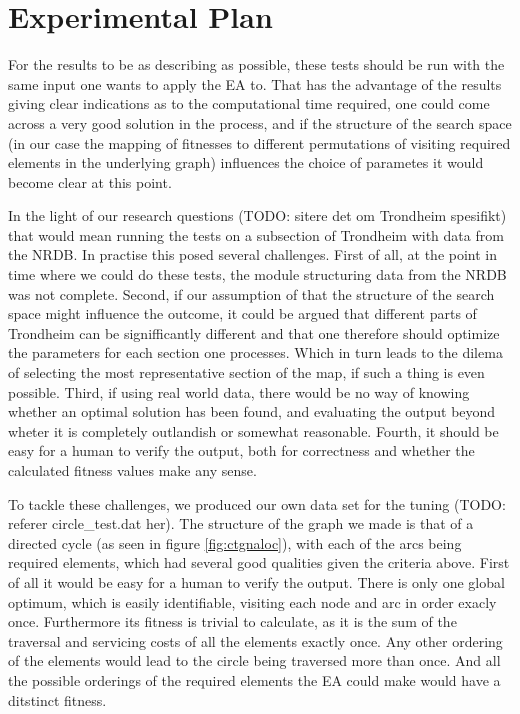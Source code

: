 \section{Experimental Plan} %
\label{sec:experimental_plan}
For the results to be as describing as possible, these tests should be run with the same input one wants to apply the EA to. That has the advantage of the results giving clear indications as to the computational time required, one could come across a very good solution in the process, and if the structure of the search space (in our case the mapping of fitnesses to different permutations of visiting required elements in the underlying graph) influences the choice of parametes it would become clear at this point.

In the light of our research questions (TODO: sitere det om Trondheim spesifikt) that would mean running the tests on a subsection of Trondheim with data from the NRDB. In practise this posed several challenges. First of all, at the point in time where we could do these tests, the module structuring data from the NRDB was not complete. Second, if our assumption of that the structure of the search space might influence the outcome, it could be argued that different parts of Trondheim can be signifficantly different and that one therefore should optimize the parameters for each section one processes. Which in turn leads to the dilema of selecting the most representative section of the map, if such a thing is even possible. Third, if using real world data, there would be no way of knowing whether an optimal solution has been found, and evaluating the output beyond wheter it is completely outlandish or somewhat reasonable. Fourth, it should be easy for a human to verify the output, both for correctness and whether the calculated fitness values make any sense.

To tackle these challenges, we produced our own data set for the tuning (TODO: referer circle\_test.dat her). The structure of the graph we made is that of a directed cycle (as seen in figure \ref{fig:ctgnaloc}), with each of the arcs being required elements, which had several good qualities given the criteria above. First of all it would be easy for a human to verify the output. There is only one global optimum, which is easily identifiable, visiting each node and arc in order exacly once. Furthermore its fitness is trivial to calculate, as it is the sum of the traversal and servicing costs of all the elements exactly once. Any other ordering of the elements would lead to the circle being traversed more than once. And all the possible orderings of the required elements the EA could make would have a ditstinct fitness.

